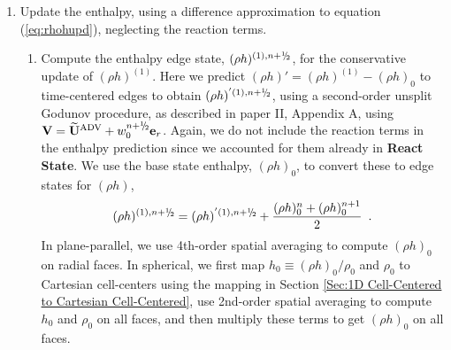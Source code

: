 \begin{description}
\begin{enumerate}
\item Update the enthalpy, using a difference approximation to
  equation (\ref{eq:rhohupd}), neglecting the reaction terms.

  \begin{enumerate}
  \renewcommand{\labelenumii}{{\bf \roman{enumii}}.}

  \item Compute the enthalpy edge state, $(\rho h)^{(1),\nph}$, for
    the conservative update of $(\rho h)^{(1)}$. Here we predict 
    $(\rho h)' = (\rho h)^{(1)} - (\rho h)_0$
    to time-centered edges to obtain $(\rho h)^{'(1),\nph}$, 
    using a second-order unsplit Godunov procedure, 
    as described in paper II, Appendix A, using $\Vb =
    \uadvtwo+w_0^{\nph} \er$.  Again, we do not include the reaction
    terms in the enthalpy prediction since we accounted for them
    already in {\bf React State}. We use the base state enthalpy,
    $(\rho h)_0$, to convert these to edge states for $(\rho h)$,
\begin{equation}
(\rho h)^{(1),\nph} = 
(\rho h)^{'(1),\nph} + \frac{(\rho h)_0^n + (\rho h)_0^{n+1}}{2} \enskip .
\end{equation}
  In plane-parallel, we use 4th-order spatial averaging to compute $(\rho h)_0$
  on radial faces.  In spherical, we first map $h_0 \equiv (\rho h)_0/\rho_0$ 
  and $\rho_0$ to Cartesian cell-centers using the mapping in Section 
  \ref{Sec:1D Cell-Centered to Cartesian Cell-Centered}, use 2nd-order spatial 
  averaging to compute $h_0$ and $\rho_0$ on all faces, and then multiply these 
  terms to get $(\rho h)_0$ on all faces.

\end{enumerate}
\end{enumerate}
\end{description}
